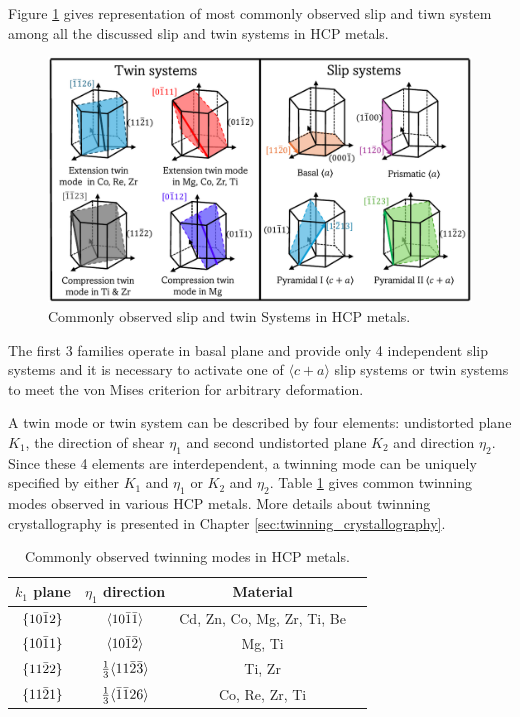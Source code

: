 Figure \ref{HCP_Slip_Twin_Systems} gives representation of most commonly observed slip and tiwn system among all the discussed slip and twin systems in HCP metals.
\begin{figure}[H]
    \centering
    \includegraphics[width=\textwidth]{images/Slip_and_twin_systems.pdf}
    \caption{Commonly observed slip and twin Systems in HCP metals.}
    \label{HCP_Slip_Twin_Systems}
\end{figure}

The first 3 families operate in basal plane and provide only 4 independent slip systems and it is necessary to activate one of $\langle c+a \rangle$ slip systems or twin systems to meet the von Mises criterion \cite{taylor1938plastic} for arbitrary deformation. 

A twin mode or twin system can be described by four elements: undistorted plane $K_1$, the direction of shear $\eta_1$ and second undistorted plane $K_2$ and direction $\eta_2$. Since these 4 elements are interdependent, a twinning mode can be uniquely specified by either $K_1$ and $\eta_1$ or $K_2$ and $\eta_2$. Table \ref{Twin_systems} gives common twinning modes observed in various HCP metals. More details about twinning crystallography is presented in Chapter \ref{sec:twinning_crystallography}.

\begin{table}[H]
\centering
\caption{Commonly observed twinning modes in HCP metals.}
\renewcommand\arraystretch{1.2}
\renewcommand\baselinestretch{1.2}
\begin{tabular}{|c|c|c|c|}
\hline

$k_1$ plane & $\eta_1$ direction & Material \\
 \hline
 $\{10\Bar{1}2\}$ & $\langle 10\Bar{1}\Bar{1} \rangle$ & Cd, Zn, Co, Mg, Zr, Ti, Be  \\
 $\{10\Bar{1}1\}$ & $\langle 10\Bar{1}\Bar{2} \rangle$ & Mg, Ti  \\
 $\{11\Bar{2}2\}$ & $\frac{1}{3} \langle 11\Bar{2}\Bar{3} \rangle$ & Ti, Zr  \\
 $\{11\Bar{2}1\}$ & $\frac{1}{3}\langle \Bar{1}\Bar{1}2 6\rangle$ & Co, Re, Zr, Ti \\
 \hline
\end{tabular}

\label{Twin_systems}
\end{table}



